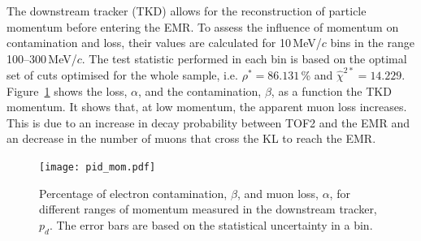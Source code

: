 The downstream tracker (TKD) allows for the reconstruction of particle momentum before entering the EMR. To assess the influence of momentum on contamination and loss, their values are calculated for 10\,MeV/$c$ bins in the range 100--300\,MeV/$c$. The test statistic performed in each bin is based on the optimal set of cuts optimised for the whole sample, i.e. $\rho^*=86.131$\,\% and $\hat{\chi}^{2*}=14.229$. Figure~\ref{fig:emr_pid_mom} shows the loss, $\alpha$, and the contamination, $\beta$, as a function the TKD momentum. It shows that, at low momentum, the apparent muon loss increases. This is due to an increase in decay probability between TOF2 and the EMR and an decrease in the number of muons that cross the KL to reach the EMR.

\begin{figure}[htb!]
	\begin{center}
		\texttt{[image: pid\_mom.pdf]}  		
		\caption{Percentage of electron contamination, $\beta$, and muon loss, $\alpha$, for different ranges of momentum measured in the downstream tracker, $p_d$. The error bars are based on the statistical uncertainty in a bin.}
		\label{fig:emr_pid_mom}
	\end{center}
\end{figure}
